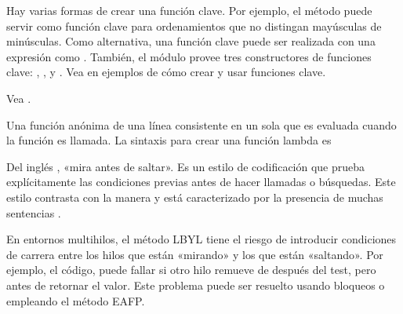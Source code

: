 \documentclass[a4,10pt,spanish]{sphinxmanual}
\begin{document}
\begin{description}
\sphinxAtStartPar
Hay varias formas de crear una función clave.  Por ejemplo, el método  puede servir como función clave para ordenamientos que no distingan mayúsculas de minúsculas.  Como alternativa, una función clave puede ser realizada con una expresión  como .  También, el módulo  provee tres constructores de funciones clave: , , y .  Vea en  ejemplos de cómo crear y usar funciones clave.

\item[{argumento nombrado\index{argumento nombrado@\spxentry{argumento nombrado}|spxpagem}\phantomsection\label{\detokenize{glossary:term-keyword-argument}}}] \leavevmode
\sphinxAtStartPar
Vea {\hyperref[\detokenize{glossary:term-argument}]{}}.

\item[{lambda\index{lambda@\spxentry{lambda}|spxpagem}\phantomsection\label{\detokenize{glossary:term-lambda}}}] \leavevmode
\sphinxAtStartPar
Una función anónima de una línea consistente en un sola {\hyperref[\detokenize{glossary:term-expression}]{}} que es evaluada cuando la función es llamada.  La sintaxis para crear una función lambda es 

\item[{LBYL\index{LBYL@\spxentry{LBYL}|spxpagem}\phantomsection\label{\detokenize{glossary:term-LBYL}}}] \leavevmode
\sphinxAtStartPar
Del inglés , «mira antes de saltar».  Es un estilo de codificación que prueba explícitamente las condiciones previas antes de hacer llamadas o búsquedas.  Este estilo contrasta con la manera {\hyperref[\detokenize{glossary:term-EAFP}]{}} y está caracterizado por la presencia de muchas sentencias .

\sphinxAtStartPar
En entornos multi\sphinxhyphen{}hilos, el método LBYL tiene el riesgo de introducir condiciones de carrera entre los hilos que están «mirando» y los que están «saltando».  Por ejemplo, el código,   puede fallar si otro hilo remueve  de  después del test, pero antes de retornar el valor.  Este problema puede ser resuelto usando bloqueos o empleando el método EAFP.


\end{description}
\end{document}
